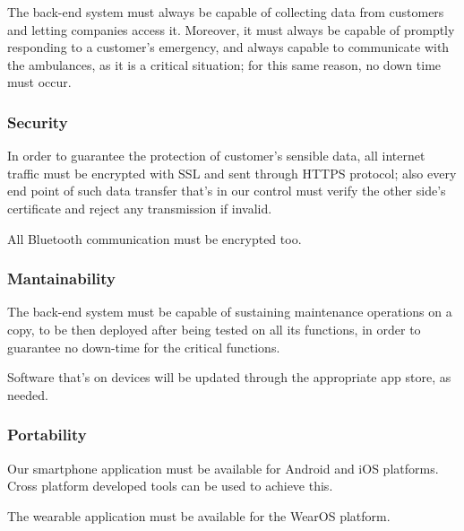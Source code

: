 \documentclass[../main.tex]{subfiles}
\begin{document}
The back-end system must always be capable of collecting data from customers and letting companies access it. Moreover, it must always be capable of promptly responding to a customer's emergency, and always capable to communicate with the ambulances, as it is a critical situation; for this same reason, no down time must occur.

\subsubsection{Security}

In order to guarantee the protection of customer's sensible data, all internet traffic must be encrypted with SSL and sent through HTTPS protocol; also every end point of such data transfer that's in our control must verify the other side's certificate and reject any transmission if invalid.

All Bluetooth communication must be encrypted too.

\subsubsection{Mantainability}

The back-end system must be capable of sustaining maintenance operations on a copy, to be then deployed after being tested on all its functions, in order to guarantee no down-time for the critical functions.

Software that's on devices will be updated through the appropriate app store, as needed.

\subsubsection{Portability}

Our smartphone application must be available for Android and iOS platforms. Cross platform developed tools can be used to achieve this.

The wearable application must be available for the WearOS platform.
\end{document}
